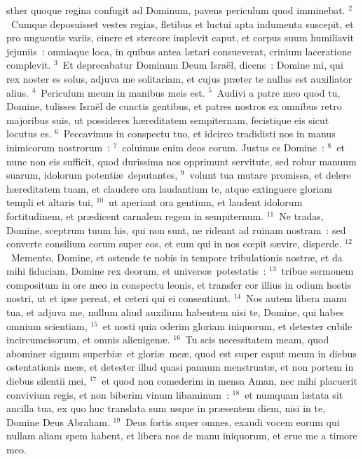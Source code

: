 \bchapter
{}sther quoque regina confugit ad Dominum, pavens periculum quod imminebat.
${}^{2}$~Cumque deposuisset vestes regias, fletibus et luctui apta indumenta suscepit, et pro unguentis variis, cinere et stercore implevit caput, et corpus suum humiliavit jejuniis~: omniaque loca, in quibus antea l\ae tari consueverat, crinium laceratione complevit.
${}^{3}$~Et deprecabatur Dominum Deum Isra\"el, dicens~: Domine mi, qui rex noster es solus, adjuva me solitariam, et cujus pr\ae ter te nullus est auxiliator alius.
${}^{4}$~Periculum meum in manibus meis est.
${}^{5}$~Audivi a patre meo quod tu, Domine, tulisses Isra\"el de cunctis gentibus, et patres nostros ex omnibus retro majoribus suis, ut possideres h\ae reditatem sempiternam, fecistique eis sicut locutus es.
${}^{6}$~Peccavimus in conspectu tuo, et idcirco tradidisti nos in manus inimicorum nostrorum~:
${}^{7}$~coluimus enim deos eorum. Justus es Domine~:
${}^{8}$~et nunc non eis sufficit, quod durissima nos opprimunt servitute, sed robur manuum suarum, idolorum potenti\ae\ deputantes,
${}^{9}$~volunt tua mutare promissa, et delere h\ae reditatem tuam, et claudere ora laudantium te, atque extinguere gloriam templi et altaris tui,
${}^{10}$~ut aperiant ora gentium, et laudent idolorum fortitudinem, et pr\ae dicent carnalem regem in sempiternum.
${}^{11}$~Ne tradas, Domine, sceptrum tuum his, qui non sunt, ne rideant ad ruinam nostram~: sed converte consilium eorum super eos, et eum qui in nos cœpit s\ae vire, disperde.
${}^{12}$~Memento, Domine, et ostende te nobis in tempore tribulationis nostr\ae , et da mihi fiduciam, Domine rex deorum, et univers\ae\ potestatis~:
${}^{13}$~tribue sermonem compositum in ore meo in conspectu leonis, et transfer cor illius in odium hostis nostri, ut et ipse pereat, et ceteri qui ei consentiunt.
${}^{14}$~Nos autem libera manu tua, et adjuva me, nullum aliud auxilium habentem nisi te, Domine, qui habes omnium scientiam,
${}^{15}$~et nosti quia oderim gloriam iniquorum, et detester cubile incircumcisorum, et omnis alienigen\ae .
${}^{16}$~Tu scis necessitatem meam, quod abominer signum superbi\ae\ et glori\ae\ me\ae , quod est super caput meum in diebus ostentationis me\ae , et detester illud quasi pannum menstruat\ae , et non portem in diebus silentii mei,
${}^{17}$~et quod non comederim in mensa Aman, nec mihi placuerit convivium regis, et non biberim vinum libaminum~:
${}^{18}$~et numquam l\ae tata sit ancilla tua, ex quo huc translata sum usque in pr\ae sentem diem, nisi in te, Domine Deus Abraham.
${}^{19}$~Deus fortis super omnes, exaudi vocem eorum qui nullam aliam spem habent, et libera nos de manu iniquorum, et erue me a timore meo.

